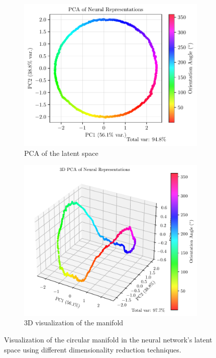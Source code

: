 \documentclass[11pt,a4paper]{article}
\begin{document}
\begin{figure}[h]
    \centering
    \begin{subfigure}[b]{0.48\linewidth}
        \centering
        \includegraphics[width=\linewidth]{results/pca_latent_space.pdf}
        \caption{PCA of the latent space}
    \end{subfigure}
    \hfill
    \begin{subfigure}[b]{0.48\linewidth}
        \centering
        \includegraphics[width=\linewidth]{results/3d_manifold.pdf}
        \caption{3D visualization of the manifold}
    \end{subfigure}
    \caption{Visualization of the circular manifold in the neural network's latent space using different dimensionality reduction techniques.}
    \label{fig:pca_latent_space}
\end{figure}
\end{document}

